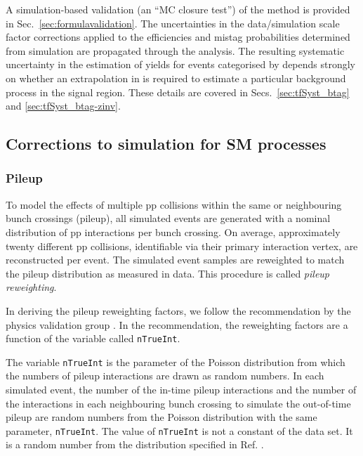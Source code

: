 A simulation-based validation (\ie an ``MC closure test'') of the
method is provided in Sec.~\ref{sec:formulavalidation}. The
uncertainties in the data/simulation scale factor corrections applied
to the efficiencies and mistag probabilities determined from
simulation are propagated through the analysis. The resulting
systematic uncertainty in the estimation of yields for events
categorised by \nb depends strongly on whether an extrapolation in \nb
is required to estimate a particular background process in the signal
region. These details are covered in Secs.~\ref{sec:tfSyst_btag} and
\ref{sec:tfSyst_btag-zinv}.

\subsection{Corrections to simulation for SM processes}
\label{sec:sim-corrs}

\subsubsection{Pileup}
\label{sec:pileup-reweighting}

To model the effects of multiple pp collisions within the same or
neighbouring bunch crossings (pileup), all simulated events are
generated with a nominal distribution of pp interactions per bunch
crossing. On average, approximately twenty different pp collisions,
identifiable via their primary interaction vertex, are reconstructed
per event. The simulated event samples are reweighted to match the
pileup distribution as measured in data. This procedure is called
\textit{pileup reweighting}.

In deriving the pileup reweighting factors, we follow the
recommendation by the physics validation group
\cite{twiki-PdmVPileUpDescription, twiki-PileupJSONFileforData}. In
the recommendation, the reweighting factors are a function of the
variable called \verb!nTrueInt!.

The variable \verb!nTrueInt! is the parameter of the Poisson
distribution from which the numbers of pileup interactions are drawn
as random numbers. In each simulated event, the number of the in-time
pileup interactions and the number of the interactions in each
neighbouring bunch crossing to simulate the out-of-time pileup are
random numbers from the Poisson distribution with the same parameter,
\verb!nTrueInt!. The value of \verb!nTrueInt! is not a constant of the
data set. It is a random number from the distribution specified in
Ref. \cite{github-mix_2016_25ns_SpringMC_PUScenarioV1_PoissonOOTPU_cfi}.

